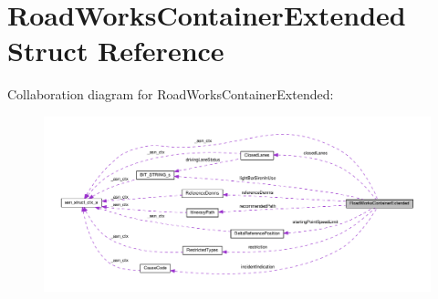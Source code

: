 \hypertarget{structRoadWorksContainerExtended}{}\section{Road\+Works\+Container\+Extended Struct Reference}
\label{structRoadWorksContainerExtended}


Collaboration diagram for Road\+Works\+Container\+Extended\+:\nopagebreak
\begin{figure}[H]
\begin{center}
\leavevmode
\includegraphics[width=350pt]{structRoadWorksContainerExtended__coll__graph}
\end{center}
\end{figure}
